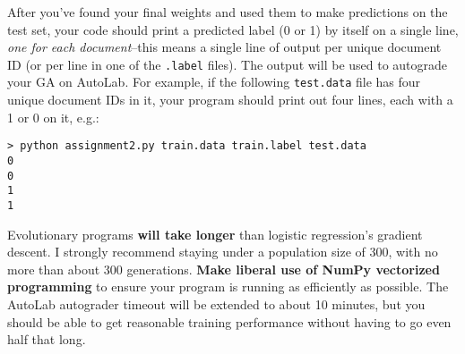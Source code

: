 \documentclass[paper=a4, fontsize=11pt]{scrartcl} %
\numberwithin{figure}{section} %
\numberwithin{table}{section} %
\begin{document}
After you've found your final weights and used them to make predictions on the test set, your code should print a predicted label (0 or 1) by itself on a single line, \emph{one for each document}--this means a single line of output per unique document ID (or per line in one of the \texttt{.label} files). The output will be used to autograde your GA on AutoLab. For example, if the following \texttt{test.data} file has four unique document IDs in it, your program should print out four lines, each with a 1 or 0 on it, e.g.:

\begin{verbatim}
> python assignment2.py train.data train.label test.data
0
0
1
1
\end{verbatim}

Evolutionary programs \textbf{will take longer} than logistic regression's gradient descent. I strongly recommend staying under a population size of 300, with no more than about 300 generations. \textbf{Make liberal use of NumPy vectorized programming} to ensure your program is running as efficiently as possible. The AutoLab autograder timeout will be extended to about 10 minutes, but you should be able to get reasonable training performance without having to go even half that long.
\end{document}
